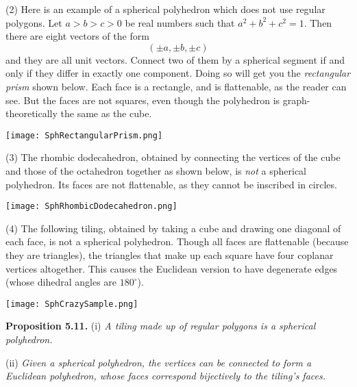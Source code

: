 \documentclass[leqno]{book}
\begin{document}
(2) Here is an example of a spherical polyhedron which does not use regular polygons.  Let $a>b>c>0$ be real numbers such that $a^2+b^2+c^2=1$.  Then there are eight vectors of the form
$$(\pm a,\pm b,\pm c)$$
and they are all unit vectors.  Connect two of them by a spherical segment if and only if they differ in exactly one component.  Doing so will get you the \emph{rectangular prism} shown below.  Each face is a rectangle, and is flattenable, as the reader can see.  But the faces are not squares, even though the polyhedron is graph-theoretically the same as the cube.
\begin{center}
\texttt{[image: SphRectangularPrism.png]}
\end{center}

(3) The rhombic dodecahedron, obtained by connecting the vertices of the cube and those of the octahedron together as shown below, is \emph{not} a spherical polyhedron.  Its faces are not flattenable, as they cannot be inscribed in circles.
\begin{center}
\texttt{[image: SphRhombicDodecahedron.png]}
\end{center}

(4) The following tiling, obtained by taking a cube and drawing one diagonal of each face, is not a spherical polyhedron.  Though all faces are flattenable (because they are triangles), the triangles that make up each square have four coplanar vertices altogether.  This causes the Euclidean version to have degenerate edges (whose dihedral angles are $180^\circ$).
\begin{center}
\texttt{[image: SphCrazySample.png]}
\end{center}

\noindent\textbf{Proposition 5.11.} (i) \emph{A tiling made up of regular polygons is a spherical polyhedron.}

(ii) \emph{Given a spherical polyhedron, the vertices can be connected to form a Euclidean polyhedron, whose faces correspond bijectively to the tiling's faces.}\\
\end{document}
